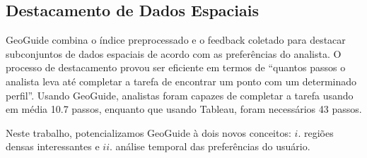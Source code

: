 \subsection{Destacamento de Dados Espaciais}

GeoGuide combina o índice preprocessado e o feedback coletado para destacar subconjuntos de dados espaciais de acordo com as preferências do analista. O processo de destacamento provou ser eficiente em termos de ``quantos passos o analista leva até completar a tarefa de encontrar um ponto com um determinado perfil''. Usando GeoGuide, analistas foram capazes de completar a tarefa usando em média 10.7 passos, enquanto que usando Tableau, foram necessários 43 passos.


\closesubsection
Neste trabalho, potencializamos GeoGuide à dois novos conceitos: $i$. regiões densas interessantes e $ii$. análise temporal das preferências do usuário.